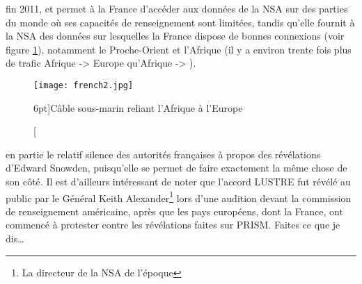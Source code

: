  fin 2011\cite{lustre}, et permet à la France
d'accéder aux données de la NSA sur des parties du monde où ses capacités de renseignement
sont limitées, tandis qu'elle fournit à la NSA des données sur lesquelles la
France dispose de bonnes connexions (voir figure \ref{fig:french2}), notamment
le Proche-Orient et l'Afrique (il y a environ trente fois plus de trafic Afrique -> Europe qu'Afrique ->
\EUA).

\vspace{0.7cm}
\begin{figure}
\texttt{[image: french2.jpg]}
\caption[Câble sous-marin reliant l'Afrique à l'Europe][6pt]{Câble sous-marin
reliant l'Afrique à l'Europe}
\label{fig:french2}
\end{figure}

 en partie le relatif silence des
autorités françaises à propos des révélations d'Edward Snowden, puisqu'elle se
permet de faire exactement la même chose de son côté. Il
est d'ailleurs intéressant de noter que l'accord LUSTRE fut révélé au public par
le Général Keith Alexander\footnote{La directeur de la NSA de l'époque} lors
d'une audition devant la commission de renseignement américaine, après que les pays
européens, dont la France, ont commencé à protester contre les révélations
faites sur PRISM. Faites ce que je dis\ldots